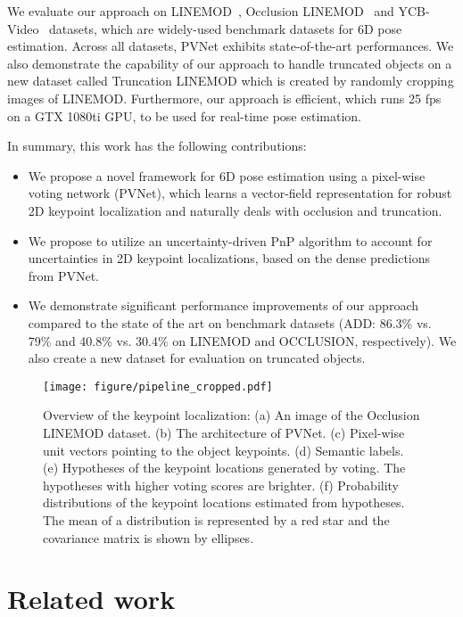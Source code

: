 \documentclass[10pt,twocolumn,letterpaper]{article}
\begin{document}
We evaluate our approach on  LINEMOD~\cite{hinterstoisser2012model}, Occlusion LINEMOD~\cite{brachmann2014learning} and YCB-Video~\cite{xiang2017posecnn} datasets, which are widely-used benchmark datasets for 6D pose estimation. Across all datasets, PVNet exhibits state-of-the-art performances. We also demonstrate the capability of our approach to handle truncated objects on a new dataset called Truncation LINEMOD which is created by randomly cropping images of LINEMOD. Furthermore, our approach is efficient, which runs 25 fps on a GTX 1080ti GPU, to be used for real-time pose estimation.



In summary, this work has the following contributions:
\begin{itemize}
\item We propose a novel framework for 6D pose estimation using a pixel-wise voting network (PVNet), which learns a vector-field representation for robust 2D keypoint localization and naturally deals with occlusion and truncation.
\item We propose to utilize an uncertainty-driven PnP algorithm to account for uncertainties in 2D keypoint localizations, based on the dense predictions from PVNet. 
\item We demonstrate significant performance improvements of our approach compared to the state of the art on benchmark datasets  (ADD: 86.3\% vs. 79\% and 40.8\% vs. 30.4\% on LINEMOD and OCCLUSION, respectively). We also create a new dataset for evaluation on truncated objects.
\end{itemize}


\begin{figure*}
\begin{center}
\texttt{[image: figure/pipeline\_cropped.pdf]}
   \caption{Overview of the keypoint localization: (a) An image of the Occlusion LINEMOD dataset. (b) The architecture of PVNet. (c) Pixel-wise unit vectors pointing to the object keypoints. (d) Semantic labels. (e) Hypotheses of the keypoint locations generated by voting. The hypotheses with higher voting scores are brighter.  (f) Probability distributions of the keypoint locations estimated from hypotheses. The mean of a distribution is represented by a red star and the covariance matrix is shown by ellipses.}
    \label{fig:pipeline}
\end{center}
\vspace{-4mm}
\end{figure*}
 \section{Related work}
\end{document}
